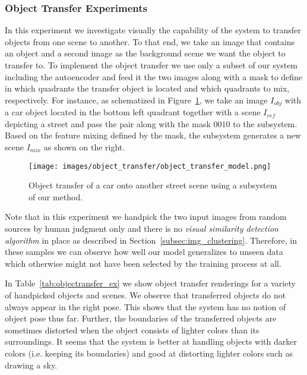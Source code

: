 \documentclass[12pt,a4paper]{article}
\begin{document}
\subsubsection{Object Transfer Experiments}\label{subsubsec:objTransfExp}
In this experiment we investigate visually the capability of the system to transfer objects from one scene to another. To that end, we take an image that contains an object and a second image as the background scene we want the object to transfer to. To implement the object transfer we use only a subset of our system including the autoencoder and feed it the two images along with a mask to define in which quadrants the transfer object is located and which quadrants to mix, respectively. For instance, as schematized in Figure~\ref{fig:objectransfer_arch}, we take an image $I_{obj}$ with a car object located in the bottom left quadrant together with a scene $I_{ref}$ depicting a street and pass the pair along with the mask $0010$ to the subsystem. Based on the feature mixing defined by the mask, the subsystem generates a new scene $I_{mix}$ as shown on the right.
\begin{figure}[ht]
\centering
\texttt{[image: images/object\_transfer/object\_transfer\_model.png]}
\caption{Object transfer of a car onto another street scene using a subsystem of our method.}
\label{fig:objectransfer_arch}
\end{figure}
Note that in this experiment we handpick the two input images from random sources by human judgment only and there is no \textit{visual similarity detection algorithm} in place as described in Section~\ref{subsec:img_clustering}. Therefore, in these samples we can observe how well our model generalizes to unseen data which otherwise might not have been selected by the training process at all.

In Table~\ref{tab:objectransfer_ex} we show object transfer renderings for a variety of handpicked objects and scenes. We observe that transferred objects do not always appear in the right pose. This shows that the system has no notion of object pose thus far. Further, the boundaries of the transferred objects are sometimes distorted when the object consists of lighter colors than its surroundings. It seems that the system is better at handling objects with darker colors (i.e. keeping its boundaries) and good at distorting lighter colors such as drawing a sky.

\end{document}
